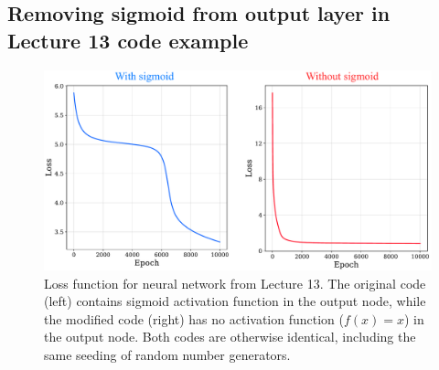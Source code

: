 \subsection{Removing sigmoid from output layer in Lecture 13 code example}

\begin{figure}[!ht]
  \centering
  \includegraphics[width=1\textwidth]{figures/lecture13_loss_compared.pdf}
  \caption{Loss function for neural network from Lecture 13. The original code (left) contains sigmoid activation function in the output node, while the modified code (right) has no activation function ($f(x) = x$) in the output node. Both codes are otherwise identical, including the same seeding of random number generators.}
  \label{q1_lecture13_loss_compare}
\end{figure}



